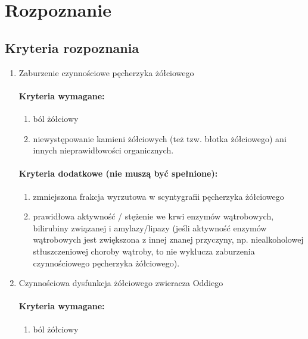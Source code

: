\section{Rozpoznanie}

\subsection{Kryteria rozpoznania}

\begin{enumerate}
    \item Zaburzenie czynnościowe pęcherzyka żółciowego

\paragraph{Kryteria wymagane:}

\begin{enumerate}
    \item ból żółciowy

    \item niewystępowanie kamieni żółciowych (też tzw. błotka żółciowego) ani innych nieprawidłowości organicznych.
\end{enumerate}

\paragraph{Kryteria dodatkowe (nie muszą być spełnione):}

\begin{enumerate}
    \item zmniejszona frakcja wyrzutowa w scyntygrafii pęcherzyka żółciowego

    \item prawidłowa aktywność / stężenie we krwi enzymów wątrobowych, bilirubiny związanej i amylazy/lipazy (jeśli aktywność enzymów wątrobowych jest zwiększona z innej znanej przyczyny, np. niealkoholowej stłuszczeniowej choroby wątroby, to nie wyklucza zaburzenia czynnościowego pęcherzyka żółciowego).
\end{enumerate}

\item Czynnościowa dysfunkcja żółciowego zwieracza Oddiego

\paragraph{Kryteria wymagane:}

\begin{enumerate}
    \item ból żółciowy


\end{enumerate}
\end{enumerate}
